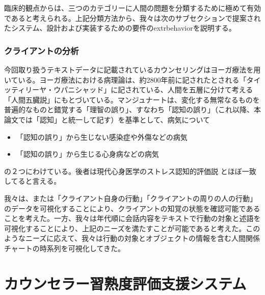 \documentclass[shuuron]{kuee}
\begin{document}
 臨床的観点からは、三つのカテゴリーに人間の問題を分類するために極めて有効であると考えられる。上記分類方法から、我々は次のサブセクションで提案されたシステム、設計および実装するための要件のextrbehaviorを説明する。
\subsection{クライアントの分析}

今回取り扱うテキストデータに記載されているカウンセリングはヨーガ療法を用いている。ヨーガ療法における病理論は、約2800年前に記されたとされる「タイッティリーヤ・ウパニシャッド」に記されている、人間を五層に分けて考える「人間五臓説」にもとづいている\cite{kimura}。マンジュナート\cite{manjunath}は、変化する無常なるものを普遍的なものと錯覚する「理智の誤り」、すなわち「認知の誤り」（これ以降、本論文では「認知」と統一して記す）を基準として、病気について
\begin{itemize}
\item 「認知の誤り」から生じない感染症や外傷などの病気
\item 「認知の誤り」から生じる心身病などの病気
\end{itemize}
の２つにわけている。後者は現代心身医学のストレス認知的評価説
\cite{Lazarus}とほぼ一致してると言える\cite{Darshana}。



 我々は、または「クライアント自身の行動」「クライアントの周りの人の行動」のデータを可視化することにより、クライアントの知覚の状態を確認可能であることを考えた。一方、我々は年代順に会話内容をテキストで行動の対象と述語を可視化することにより、上記のニーズを満たすことが可能であると考えた。このようなニーズに応えて、我々は行動の対象とオブジェクトの情報を含む人間関係チャートの時系列を可視化してきた。



\chapter{カウンセラー習熟度評価支援システム}
\end{document}
